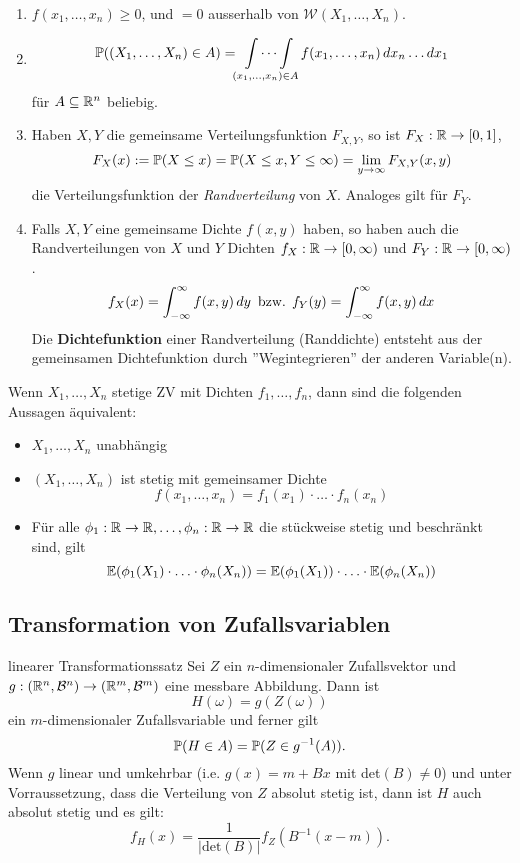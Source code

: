 \begin{enumerate}
    \item $f(x_1, \ldots, x_n) \geq 0$, und $ = 0$ ausserhalb von $\mathcal{W}(X_1, \ldots, X_n)$.
    \item 
    \begin{gather*}
        \P((X_1, \ldots, X_n) \in A) = \idotsint\limits_{(x_1, \ldots, x_n) \in A} f(x_1, \ldots, x_n) \mathop{dx_n}\ldots\mathop{dx_1}
    \end{gather*}
    für $A \subseteq \R^n$ beliebig.
    \item Haben $X, Y$ die gemeinsame Verteilungsfunktion $F_{X,Y}$, so ist $F_X: \R \to [0,1]$,
    $$F_X(x) := \P(X \leq x) = \P(X \leq x, Y \leq \infty) = \lim_{y \to \infty}F_{X,Y}(x,y)$$
    die Verteilungsfunktion der \textit{Randverteilung} von $X$. Analoges gilt für $F_Y$.
    \item Falls $X,Y$ eine gemeinsame Dichte $f(x,y)$ haben, so haben auch die Randverteilungen von $X$ und $Y$ Dichten $f_X: \R \to [0, \infty)$ und $F_Y: \R \to [0, \infty)$.
    $$f_X(x) = \int_{-\infty}^{\infty}f(x,y)\mathop{dy} \text{ bzw. } f_Y(y)=\int_{-\infty}^{\infty}f(x,y)\dx$$
    Die \textbf{Dichtefunktion} einer Randverteilung (Randdichte) entsteht aus der gemeinsamen Dichtefunktion durch ''Wegintegrieren'' der anderen Variable(n).
\end{enumerate}
Wenn $X_1, \ldots, X_n$ stetige ZV mit Dichten $f_1, \ldots, f_n$, dann sind die folgenden Aussagen äquivalent:
\begin{itemize}
    \item $X_1, \ldots, X_n$ unabhängig
    \item $(X_1, \ldots, X_n)$ ist stetig mit gemeinsamer Dichte $$f(x_1, \ldots, x_n) = f_1(x_1) \cdot \ldots \cdot f_n(x_n)$$
    \item Für alle $\phi_1: \R \to \R, \ldots, \phi_n: \R \to \R$ die stückweise stetig und beschränkt sind, gilt 
    $$\E(\phi_1(X_1)\cdot \ldots \cdot \phi_n(X_n)) = \E(\phi_1(X_1)) \cdot \ldots \cdot \E(\phi_n(X_n))$$
\end{itemize}
\subsection{Transformation von Zufallsvariablen}
\begin{subbox}{linearer Transformationssatz}
    Sei $Z$ ein $n$-dimensionaler Zufallsvektor und $g: (\R^n, \mathcal{B}^n) \to (\R^m, \mathcal{B}^m)$ eine messbare Abbildung. Dann ist
    $$H(\omega) = g(Z(\omega))$$
    ein $m$-dimensionaler Zufallsvariable und ferner gilt
    $$\P(H \in A) = \P(Z \in g^{-1}(A)).$$
    Wenn $g$ linear und umkehrbar (i.e. $g(x) = m + Bx$ mit det$(B) \neq 0$) und unter Vorraussetzung, dass die Verteilung von $Z$ absolut stetig ist, dann ist $H$ auch absolut stetig und es gilt:
    $$f_H(x)=\frac{1}{|\text{det}(B)|}f_Z(B^{-1}(x-m)).$$
\end{subbox}
